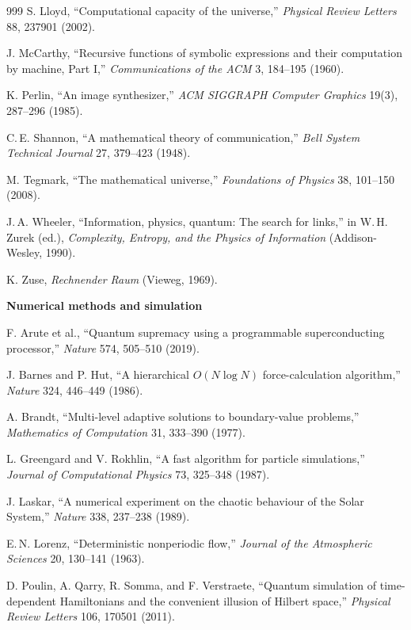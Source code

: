 \begin{thebibliography}{999}
 S. Lloyd, ``Computational capacity of the universe,'' \textit{Physical Review Letters} 88, 237901 (2002).

 J. McCarthy, ``Recursive functions of symbolic expressions and their computation by machine, Part I,'' \textit{Communications of the ACM} 3, 184--195 (1960).

 K. Perlin, ``An image synthesizer,'' \textit{ACM SIGGRAPH Computer Graphics} 19(3), 287--296 (1985).

 C.\,E. Shannon, ``A mathematical theory of communication,'' \textit{Bell System Technical Journal} 27, 379--423 (1948).

 M. Tegmark, ``The mathematical universe,'' \textit{Foundations of Physics} 38, 101--150 (2008).

 J.\,A. Wheeler, ``Information, physics, quantum: The search for links,'' in W.\,H. Zurek (ed.), \textit{Complexity, Entropy, and the Physics of Information} (Addison-Wesley, 1990).

 K. Zuse, \textit{Rechnender Raum} (Vieweg, 1969).

\item[] \textbf{Numerical methods and simulation}

 F. Arute et al., ``Quantum supremacy using a programmable superconducting processor,'' \textit{Nature} 574, 505--510 (2019).

 J. Barnes and P. Hut, ``A hierarchical \(O(N \log N)\) force-calculation algorithm,'' \textit{Nature} 324, 446--449 (1986).

 A. Brandt, ``Multi-level adaptive solutions to boundary-value problems,'' \textit{Mathematics of Computation} 31, 333--390 (1977).

 L. Greengard and V. Rokhlin, ``A fast algorithm for particle simulations,'' \textit{Journal of Computational Physics} 73, 325--348 (1987).

 J. Laskar, ``A numerical experiment on the chaotic behaviour of the Solar System,'' \textit{Nature} 338, 237--238 (1989).

 E.\,N. Lorenz, ``Deterministic nonperiodic flow,'' \textit{Journal of the Atmospheric Sciences} 20, 130--141 (1963).

 D. Poulin, A. Qarry, R. Somma, and F. Verstraete, ``Quantum simulation of time-dependent Hamiltonians and the convenient illusion of Hilbert space,'' \textit{Physical Review Letters} 106, 170501 (2011).


\end{thebibliography}
